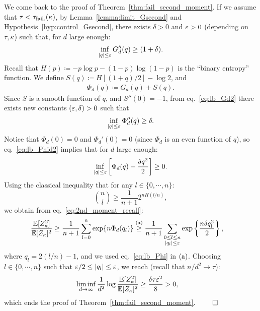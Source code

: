 \myskip
We come back to the proof of Theorem~\ref{thm:fail_second_moment}.
If we assume that $\tau < \tau_{\rm fail.}(\kappa)$, by  Lemma~\ref{lemma:limit_Gsecond} and Hypothesis~\ref{hyp:control_Gsecond}, there exists 
$\delta > 0$ and $\varepsilon > 0$ (depending on $\tau, \kappa$) such that, for $d$ large enough: 
\begin{equation}\label{eq:lb_Gd2}
    \inf_{|q| \leq \varepsilon} G_d''(q) \geq (1+\delta).
\end{equation}
Recall that $H(p) \coloneqq - p \log p - (1-p)\log (1-p)$ is the ``binary entropy'' function. We define $S(q) \coloneqq H[(1+q)/2] - \log 2$, 
and
\begin{align}\label{eq:def_Phid}
    \Phi_d(q) \coloneqq G_d(q) + S(q).
\end{align}
Since $S$ is a smooth function of $q$, and $S''(0) = -1$, from eq.~\eqref{eq:lb_Gd2} there exists new constants $(\varepsilon, \delta) > 0$ 
such that
\begin{equation}\label{eq:lb_Phid2}
    \inf_{|q| \leq \varepsilon} \Phi_d''(q) \geq \delta.
\end{equation}
Notice that $\Phi_d(0) = 0$ and $\Phi_d'(0) = 0$ (since $\Phi_d$ is an even function of $q$), so eq.~\eqref{eq:lb_Phid2} implies 
that for $d$ large enough: 
\begin{equation}\label{eq:lb_Phi}
     \inf_{|q| \leq \varepsilon}\left[\Phi_d(q) - \frac{\delta q^2}{2}\right] \geq 0.
\end{equation}
Using the classical inequality that for any $l \in \{0, \cdots, n\}$:
\begin{equation*}
   \binom{n}{l} \geq \frac{1}{n+1} 2^{n H(l/n)},
\end{equation*}
we obtain from eq.~\eqref{eq:2nd_moment_recall}:
\begin{align*}
    \frac{\mathbb{E}[Z_\kappa^2]}{\mathbb{E}[Z_\kappa]^2} &\geq \frac{1}{n+1} \sum_{l=0}^n \exp\{n \Phi_d(q_l)\} \overset{\mathrm{(a)}}{\geq} \frac{1}{n+1} \sum_{\substack{0 \leq l \leq n \\ |q_l| \leq \varepsilon}} \exp\left\{\frac{n\delta q_l^2}{2}\right\},
\end{align*}
where $q_l = 2 (l/n) - 1$, and we used eq.~\eqref{eq:lb_Phi} in $(\rm a)$.
Choosing $l \in \{0, \cdots, n\}$ such that $\varepsilon/2 \leq |q_l| \leq \varepsilon$, we reach (recall that $n/d^2 \to \tau$):
\begin{align*}
    \liminf_{d \to \infty} \frac{1}{d^2} \log \frac{\mathbb{E}[Z_\kappa^2]}{\mathbb{E}[Z_\kappa]^2} &\geq \frac{\delta \tau \varepsilon^2}{8} > 0, 
\end{align*}
which ends the proof of Theorem~\ref{thm:fail_second_moment}. $\qed$

